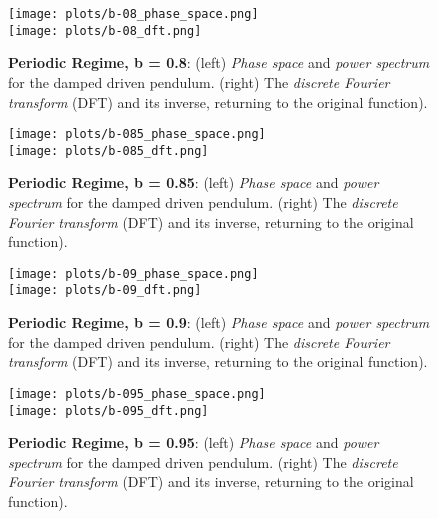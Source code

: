 \documentclass[10pt]{article}
\begin{document}
\begin{figure} [ht]
\begin{center}
\texttt{[image: plots/b-08\_phase\_space.png]} \\
\texttt{[image: plots/b-08\_dft.png]} 
\caption{{\bf Periodic Regime, b = 0.8}: (left) {\it Phase space} and {\it power spectrum} for the damped driven  pendulum. (right) The {\it discrete Fourier transform} (DFT) and its inverse, returning to the original function).}
\end{center}
\end{figure}

\begin{figure} [ht]
\begin{center}
\texttt{[image: plots/b-085\_phase\_space.png]} \\
\texttt{[image: plots/b-085\_dft.png]} 
\caption{{\bf Periodic Regime, b = 0.85}: (left) {\it Phase space} and {\it power spectrum} for the damped driven  pendulum. (right) The {\it discrete Fourier transform} (DFT) and its inverse, returning to the original function).}
\end{center}
\end{figure}


\begin{figure} [ht]
\begin{center}
\texttt{[image: plots/b-09\_phase\_space.png]} \\
\texttt{[image: plots/b-09\_dft.png]} 
\caption{{\bf Periodic Regime, b = 0.9}: (left) {\it Phase space} and {\it power spectrum} for the damped driven  pendulum. (right) The {\it discrete Fourier transform} (DFT) and its inverse, returning to the original function).}
\end{center}
\end{figure}

\begin{figure} [ht]
\begin{center}
\texttt{[image: plots/b-095\_phase\_space.png]} \\
\texttt{[image: plots/b-095\_dft.png]} 
\caption{{\bf Periodic Regime, b = 0.95}: (left) {\it Phase space} and {\it power spectrum} for the damped driven  pendulum. (right) The {\it discrete Fourier transform} (DFT) and its inverse, returning to the original function).}
\end{center}
\end{figure}


\quad
\end{document}
